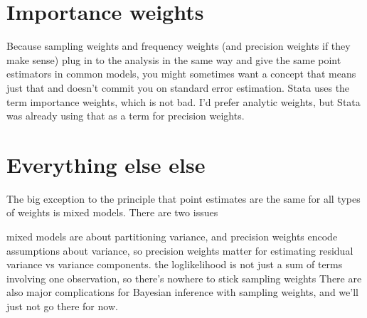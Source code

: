 \documentclass[fleqn,10pt]{latex/stylish_article} %
\begin{document}
\hypertarget{importance-weights}{%
\section{Importance weights}\label{importance-weights}}

Because sampling weights and frequency weights (and precision weights if they make sense) plug in to the analysis in the same way and give the same point estimators in common models, you might sometimes want a concept that means just that and doesn't commit you on standard error estimation. Stata uses the term importance weights, which is not bad. I'd prefer analytic weights, but Stata was already using that as a term for precision weights.

\hypertarget{everything-else-else}{%
\section{Everything else else}\label{everything-else-else}}

The big exception to the principle that point estimates are the same for all types of weights is mixed models. There are two issues

mixed models are about partitioning variance, and precision weights encode assumptions about variance, so precision weights matter for estimating residual variance vs variance components.
the loglikelihood is not just a sum of terms involving one observation, so there's nowhere to stick sampling weights
There are also major complications for Bayesian inference with sampling weights, and we'll just not go there for now.



\makeatletter

\makeatother


\end{document}
